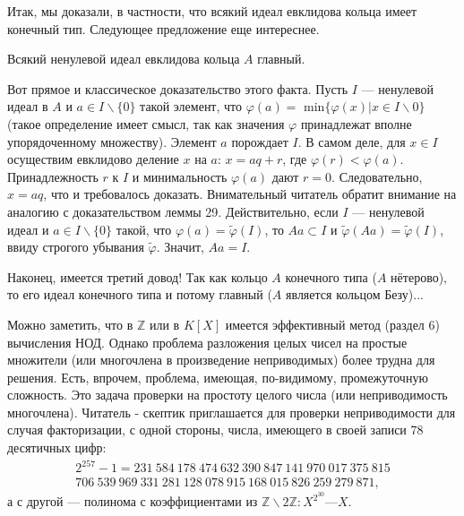 \documentclass{mai_book}
\begin{document}
Итак, мы доказали, в частности, что всякий идеал евклидова кольца имеет конечный тип. Следующее предложение еще интереснее.

\begin{predl}
\hspace*{15pt}Всякий ненулевой идеал евклидова кольца $A$ главный.
\end{predl}

\begin{myproof}
Вот прямое и классическое доказательство этого факта. Пусть 
$I$ — ненулевой идеал в $A$ и $a \in I \backslash \{0\}$ такой элемент, что 
$\varphi(a) =$ min$\{\varphi(x) | x \in I \backslash 0\}$ (такое определение имеет смысл, так 
как значения $\varphi$ принадлежат вполне упорядоченному множеству). 
Элемент $a$ порождает $I$. В самом деле, для $x \in I$ осуществим  
евклидово деление $x$ на $a$: $x = aq + r$, где $\varphi(r) < \varphi(a)$. Принадлежность $r$ 
к $I$ и минимальность $\varphi(a)$ дают $r = 0$. Следовательно, $x = aq$, что 
и требовалось доказать.\newline 
Внимательный читатель обратит внимание на аналогию с  
доказательством леммы 29. Действительно, если $I$ — ненулевой идеал и 
$ a \in I\backslash \{0\}$ такой, что $\varphi(a) = \tilde{\varphi}(I)$, то $Aa \subset I$ и $\tilde{\varphi}(Aa) = \tilde{\varphi}(I)$, ввиду 
 строгого убывания $\tilde{\varphi}$. Значит, $Aa = I$.\newline
\newpage


\noindent Наконец, имеется третий довод! Так как кольцо $A$ конечного  
типа ($A$ нётерово), то его идеал конечного типа и потому главный 
($A$ является кольцом Безу)... 
\end{myproof}

\begin{mynotice}
Можно заметить, что в $\mathbb{Z}$ или в $K[X]$ имеется  
эффективный метод (раздел 6) вычисления НОД. Однако  
проблема разложения целых чисел на простые множители (или  
многочлена в произведение неприводимых) более трудна для решения. 
Есть, впрочем, проблема, имеющая, по-видимому,  
промежуточную сложность. Это задача проверки на простоту целого числа 
(или неприводимость многочлена). Читатель - скептик  
приглашается для проверки неприводимости для случая факторизации, 
с одной стороны, числа, имеющего в своей записи 78 десятичных 
цифр:
\begin{multline*}
2^{257} - 1 = 231\: 584\: 178\: 474\: 632\: 390\: 847\: 141\: 970\: 017\: 375\: 815\\ 
706\: 539\: 969\: 331\: 281\: 128\: 078\: 915\: 168\: 015\: 826\: 259\: 279\: 871,
\end{multline*} 
а с другой — полинома с коэффициентами из $\mathbb{Z}\backslash2\mathbb{Z} : X^{2^{30}} — X$. 
\end{mynotice}
\setcounter{section}{3}
\end{document}

